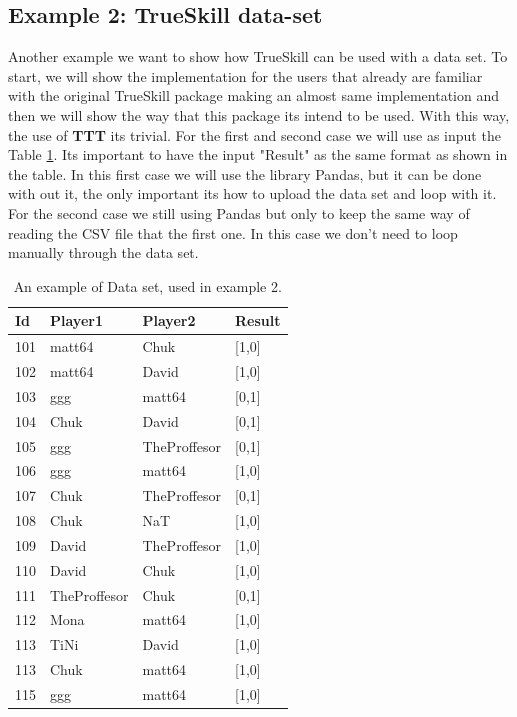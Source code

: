 \documentclass[article]{jss}
\begin{document}
\subsection{Example 2: TrueSkill data-set}
Another example we want to show how TrueSkill can be used with a data set. 
To start, we will show the implementation for the users that already are familiar with the original TrueSkill package making an almost same implementation and then we will show the way that this package its intend to be used. 
With this way, the use of \textbf{TTT} its trivial. 
For the first and second case we will use as input the Table \ref{tab:csvExample2}. Its important to have the input "Result" as the same format as shown in the table.
In this first case we will use the library Pandas, but it can be done with out it, the only important its how to upload the data set and loop with it. For the second case we still using Pandas but only to keep the same way of reading the CSV file that the first one. 
In this case we don't need to loop manually through the data set.


\begin{table}[h!]
	\centering
		\begin{tabular}{llll}
			\hline
			Id  & Player1        & Player2        & Result \\ \hline
			101 & matt64      & Chuk         & [1,0]      \\
			102 & matt64      & David        & [1,0]      \\
			103 & ggg          & matt64       & [0,1]      \\
			104 & Chuk         & David        & [0,1]      \\
			105 & ggg         & TheProffesor & [0,1]      \\
			106 & ggg          & matt64       & [1,0]      \\
			107 & Chuk         & TheProffesor & [0,1]      \\
			108 & Chuk         & NaT          & [1,0]      \\
			109 & David        & TheProffesor & [1,0]      \\
			110 & David        & Chuk         & [1,0]      \\
			111 & TheProffesor & Chuk         & [0,1]      \\
			112 & Mona         & matt64       & [1,0]      \\
			113 & TiNi         & David        & [1,0]      \\
			113 & Chuk         & matt64       & [1,0]      \\
			115 & ggg          & matt64       & [1,0]      \\ \hline
		\end{tabular}%
	\caption{An example of Data set, used in example 2. }
	\label{tab:csvExample2}
\end{table}
\end{document}
